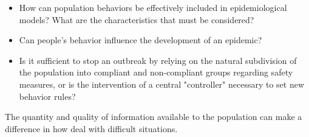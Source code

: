 \begin{itemize}
	\item How can population behaviors be effectively included in epidemiological models? What are the characteristics that must be considered?
	\item Can people's behavior influence the development of an epidemic?
	\item Is it sufficient to stop an outbreak by relying on the natural subdivision of the population into compliant and non-compliant groups regarding safety measures, or is the intervention of a central "controller" necessary to set new behavior rules?
\end{itemize}

The quantity and quality of information available to the population can make a difference in how deal with difficult situations.


